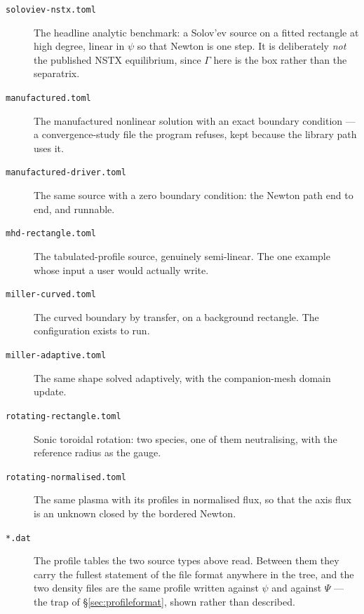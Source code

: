 \begin{description}

\item[\texttt{soloviev-nstx.toml}] The headline analytic benchmark: a Solov'ev
	source on a fitted rectangle at high degree, linear in $\psi$ so that Newton
	is one step. It is deliberately \emph{not} the published NSTX equilibrium,
	since $\Gamma$ here is the box rather than the separatrix.

\item[\texttt{manufactured.toml}] The manufactured nonlinear solution with an
	exact boundary condition --- a convergence-study file the program refuses,
	kept because the library path uses it.

\item[\texttt{manufactured-driver.toml}] The same source with a zero boundary
	condition: the Newton path end to end, and runnable.

\item[\texttt{mhd-rectangle.toml}] The tabulated-profile source, genuinely
	semi-linear. The one example whose input a user would actually write.

\item[\texttt{miller-curved.toml}] The curved boundary by transfer, on a
	background rectangle. The configuration {\meq} exists to run.

\item[\texttt{miller-adaptive.toml}] The same shape solved adaptively, with the
	companion-mesh domain update.

\item[\texttt{rotating-rectangle.toml}] Sonic toroidal rotation: two species,
	one of them neutralising, with the reference radius as the gauge.

\item[\texttt{rotating-normalised.toml}] The same plasma with its profiles in
	normalised flux, so that the axis flux is an unknown closed by the bordered
	Newton.

\item[\texttt{*.dat}] The profile tables the two source types above read.
	Between them they carry the fullest statement of the file format anywhere in
	the tree, and the two density files are the same profile written against
	$\psi$ and against $\Psi$ --- the trap of \S\ref{sec:profileformat}, shown
	rather than described.

\end{description}
